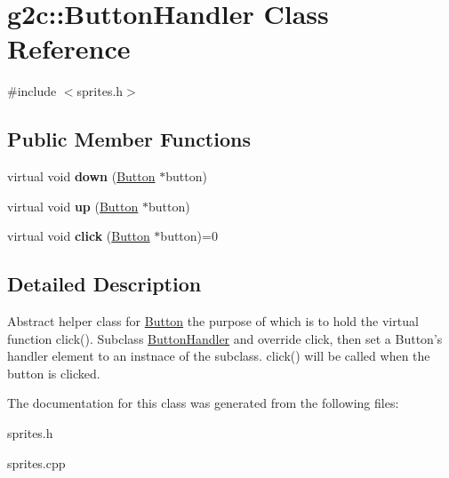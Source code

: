 \hypertarget{classg2c_1_1_button_handler}{
\section{g2c::ButtonHandler Class Reference}
\label{classg2c_1_1_button_handler}
}


{\ttfamily \#include $<$sprites.h$>$}\subsection*{Public Member Functions}
\begin{DoxyCompactItemize}
\item 
\hypertarget{classg2c_1_1_button_handler_adc10feaf556e7f9a1e27b45082e34e4e}{
virtual void {\bfseries down} (\hyperlink{classg2c_1_1_button}{Button} $\ast$button)}
\label{classg2c_1_1_button_handler_adc10feaf556e7f9a1e27b45082e34e4e}

\item 
\hypertarget{classg2c_1_1_button_handler_a28679b2bf70b70e75c4646c797374500}{
virtual void {\bfseries up} (\hyperlink{classg2c_1_1_button}{Button} $\ast$button)}
\label{classg2c_1_1_button_handler_a28679b2bf70b70e75c4646c797374500}

\item 
\hypertarget{classg2c_1_1_button_handler_ae42a49c45a666d4f16722c5e831cf968}{
virtual void {\bfseries click} (\hyperlink{classg2c_1_1_button}{Button} $\ast$button)=0}
\label{classg2c_1_1_button_handler_ae42a49c45a666d4f16722c5e831cf968}

\end{DoxyCompactItemize}


\subsection{Detailed Description}
Abstract helper class for \hyperlink{classg2c_1_1_button}{Button} the purpose of which is to hold the virtual function click(). Subclass \hyperlink{classg2c_1_1_button_handler}{ButtonHandler} and override click, then set a Button's handler element to an instnace of the subclass. click() will be called when the button is clicked. 

The documentation for this class was generated from the following files:\begin{DoxyCompactItemize}
\item 
sprites.h\item 
sprites.cpp\end{DoxyCompactItemize}
